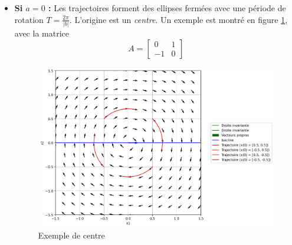             \begin{itemize}
                \item \textbf{Si $a = 0$ :} Les trajectoires forment des ellipses fermées avec une période de rotation $T = \frac{2 \pi}{|b|}$. L'origine est un \textit{centre}. Un exemple est montré en figure \ref{fig:centre}, avec la matrice
                \begin{equation}
                    A = \begin{bmatrix} 0 & 1 \\ -1 & 0 \end{bmatrix}
                \end{equation}
                \begin{figure}[ht!]
                    \centering
                    \includegraphics[width=\textwidth]{images/centre.jpg}
                    \caption{Exemple de centre}
                    \label{fig:centre}
                \end{figure}
                

\end{itemize}

